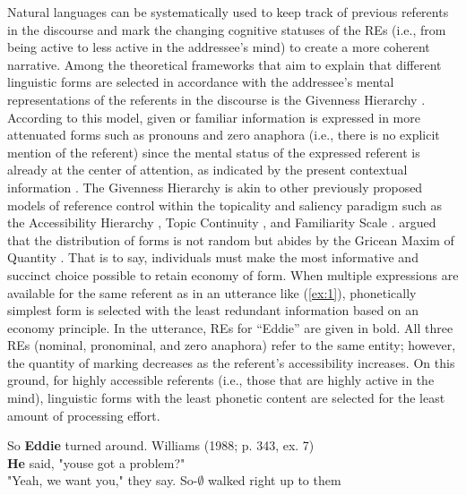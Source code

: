 \documentclass[review]{elsarticle} %
\begin{document}
Natural languages can be systematically used to keep track of previous
referents in the discourse and mark the changing cognitive statuses of
the REs (i.e., from being active to less active in the addressee's mind)
to create a more coherent narrative. Among the theoretical frameworks
that aim to explain that different linguistic forms are selected in
accordance with the addressee's mental representations of the referents
in the discourse is the Givenness Hierarchy \citep{gundel1993}.
According to this model, given or familiar information is expressed in
more attenuated forms such as pronouns and zero anaphora (i.e., there is
no explicit mention of the referent) since the mental status of the
expressed referent is already at the center of attention, as indicated
by the present contextual information \citep{chafe1976}. The Givenness
Hierarchy is akin to other previously proposed models of reference
control within the topicality and saliency paradigm such as the
Accessibility Hierarchy \citep{ariel1990}, Topic Continuity
\citep{givon1983}, and Familiarity Scale \citep{prince1981}.
\citet{gundel1993} argued that the distribution of forms is not random
but abides by the Gricean Maxim of Quantity \citep{grice1975}. That is
to say, individuals must make the most informative and succinct choice
possible to retain economy of form. When multiple expressions are
available for the same referent as in an utterance like (\ref{ex:1}),
phonetically simplest form is selected with the least redundant
information based on an economy principle. In the utterance, REs for
``Eddie'' are given in bold. All three REs (nominal, pronominal, and
zero anaphora) refer to the same entity; however, the quantity of
marking decreases as the referent's accessibility increases. On this
ground, for highly accessible referents (i.e., those that are highly
active in the mind), linguistic forms with the least phonetic content
are selected for the least amount of processing effort.

\begin{exe}
    \ex \label{ex:1}
    So \textbf{Eddie} turned around. \hfill Williams (1988; p. 343, ex. 7) \\
\textbf{He} said, "youse got a problem?" \\
"Yeah, we want you," they say.
So-$\pmb{\emptyset}$ walked right up to them \\
\end{exe}
\end{document}
